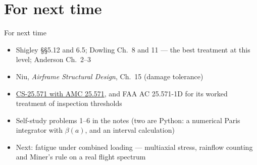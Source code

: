 \documentclass[aspectratio=169,10pt]{beamer}
\begin{document}
\section{For next time}

\begin{frame}{For next time}
\begin{itemize}
  \item Shigley \S\S5.12 and 6.5; Dowling Ch.\ 8 and 11 --- the best treatment at this level; Anderson Ch.\ 2--3
  \item Niu, \emph{Airframe Structural Design}, Ch.\ 15 (damage tolerance)
  \item \href{https://www.easa.europa.eu/en/document-library/easy-access-rules/online-publications/easy-access-rules-large-aeroplanes-cs-25}{CS-25.571 with AMC 25.571}, and FAA AC 25.571-1D for its worked treatment of inspection thresholds
  \item Self-study problems 1--6 in the notes (two are Python: a numerical Paris integrator with $\beta(a)$, and an interval calculation)
  \item Next: fatigue under combined loading --- multiaxial stress, rainflow counting and Miner's rule on a real flight spectrum
\end{itemize}
\end{frame}
\end{document}
